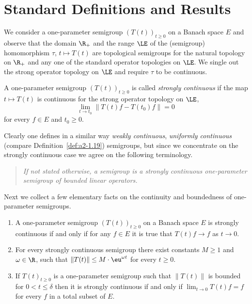 \section{Standard Definitions and Results}\label{sec:a1-1}%
We consider a one-parameter semigroup $(T(t))_{t \geq 0}$ on a Banach space $E$ and observe that the domain $\R_{+}$ and the range $\LE$ of the (semigroup) homomorphism $\tau $, $ t \mapsto T(t)$ are topological semigroups for the natural topology on $\R_{+}$ and any one of the standard operator topologies on $\LE$.
We single out the strong operator topology on $\LE$ and require $\tau$ to be continuous.
\begin{definition}\label{def:a1-1.1}
A one-parameter semigroup $(T(t))_{t\geq0}$ is called \emph{strongly continuous} if the map $t \mapsto T(t)$ is continuous for the strong operator topology on $\LE$, \eg
\[
	\lim_{t\to t_{0}} \|T(t)f - T(t_{0})f\| = 0
\]
for every $f \in E$ and $t_{0} \geq 0$.
\end{definition}
Clearly one defines in a similar way \emph{weakly continuous}, \resp \emph{uniformly continuous} (compare Definition~\ref{def:a2-1.19}) semigroups, but since we concentrate on the strongly continuous case we agree on the following terminology.
\begin{quote}
\textit{If not stated otherwise, a \emph{semigroup} is a strongly continuous one-parameter semigroup of bounded linear operators. }
\end{quote}
Next we collect a few elementary facts on the continuity and boundedness of one-parameter semigroups.
\begin{remarks}\label{rem:a1-1.2}
\begin{enumerate}[\upshape(i), wide, labelindent=.25em]

\item 
A one-parameter semigroup $(T(t))_{t \geq 0}$ on a Banach space $E$ is strongly continuous if and only if for any $f \in E$ it is true that $T(t)f \to f$ as $t \to 0$.

\item 
For every strongly continuous semigroup there exist constants $ M \geq 1 $ and $ \omega \in \R $, such that 
$ \lVert T(t) \rVert \leq M \cdot \eu^{ \omega t} $ for every $  t \geq 0 $.

\item If\/ $ T(t)_{t\geq0} $ is a one-parameter semigroup such that $ \lVert T(t) \rVert $ is bounded for
$ 0 < t \leq \delta $ then it is strongly continuous if and only if\/ $ \lim_{t\to0} T(t)f = f $ for every $ f $ in a total subset of\/ $ E $.

\end{enumerate}
\end{remarks}
